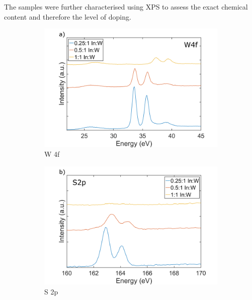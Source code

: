 The samples were further characterised using XPS to assess the exact chemical content and therefore the level of doping.

\begin{figure}[!h]
	\begin{center}
		\begin{subfigure}[b]{0.6\textwidth}
			\includegraphics[width=\textwidth]{In/XPSW4f.png}
			\caption{W 4f}
			\label{fig:InXPSW4f}
		\end{subfigure}
		\qquad
		\begin{subfigure}[b]{0.6\textwidth}
			\includegraphics[width=\textwidth]{In/XPSS2p.png}
			\caption{S 2p}
			\label{fig:InXPSS2p}
		\end{subfigure}
		\begin{subfigure}[b]{0.6\textwidth}

\end{subfigure}
\end{center}
\end{figure}
